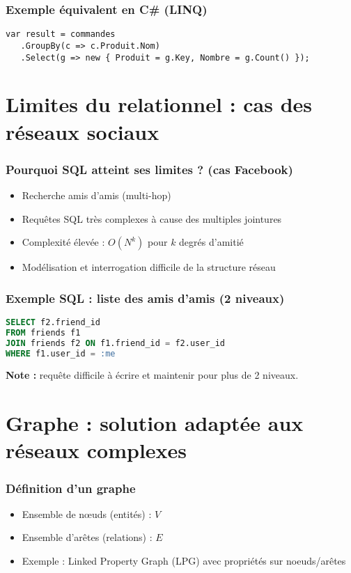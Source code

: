 \documentclass{beamer}
\begin{document}
\begin{frame}[fragile]
  \frametitle{Exemple équivalent en C\# (LINQ)}
\begin{lstlisting}[language={[Sharp]C}]
var result = commandes
   .GroupBy(c => c.Produit.Nom)
   .Select(g => new { Produit = g.Key, Nombre = g.Count() });
\end{lstlisting}
\end{frame}

\section{Limites du relationnel : cas des réseaux sociaux}

\begin{frame}
  \frametitle{Pourquoi SQL atteint ses limites ? (cas Facebook)}
  \begin{itemize}
    \item Recherche amis d’amis (multi-hop)
    \item Requêtes SQL très complexes à cause des multiples jointures
    \item Complexité élevée : $O(N^k)$ pour $k$ degrés d’amitié
    \item Modélisation et interrogation difficile de la structure réseau
  \end{itemize}
\end{frame}

\begin{frame}[fragile]
  \frametitle{Exemple SQL : liste des amis d’amis (2 niveaux)}
\begin{lstlisting}[language=SQL]
SELECT f2.friend_id
FROM friends f1
JOIN friends f2 ON f1.friend_id = f2.user_id
WHERE f1.user_id = :me
\end{lstlisting}
\textbf{Note :} requête difficile à écrire et maintenir pour plus de 2 niveaux.
\end{frame}

\section{Graphe : solution adaptée aux réseaux complexes}

\begin{frame}
  \frametitle{Définition d’un graphe}
  \begin{itemize}
    \item Ensemble de nœuds (entités) : $V$
    \item Ensemble d’arêtes (relations) : $E$
    \item Exemple : Linked Property Graph (LPG) avec propriétés sur noeuds/arêtes
  \end{itemize}
  \centering
\end{frame}
\end{document}
